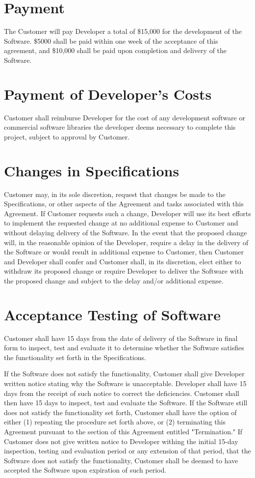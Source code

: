 \documentclass[11pt]{article}
\begin{document}
\section{Payment}	
The Customer will pay Developer a total of \$15,000 for the development of the Software. \$5000 shall be paid within one week of the acceptance of this agreement, and \$10,000 shall be paid upon completion and delivery of the Software.
\section{Payment of Developer’s Costs}
Customer shall reimburse Developer for the cost of any development software or commercial software libraries the developer deems necessary to complete this project, subject to approval by Customer.
\section{Changes in Specifications}
Customer may, in its sole discretion, request that changes be made to the Specifications, or other aspects of the Agreement and tasks associated with this Agreement. If Customer requests such a change, Developer will use its best efforts to implement the requested change at no additional expense to Customer and without delaying delivery of the Software. In the event that the proposed change will, in the reasonable opinion of the Developer, require a delay in the delivery of the Software or would result in additional expense to Customer, then Customer and Developer shall confer and Customer shall, in its discretion, elect either to withdraw its proposed change or require Developer to deliver the Software with the proposed change and subject to the delay and/or additional expense.
\section{Acceptance Testing of Software}
Customer shall have 15 days from the date of delivery of the Software in final form to inspect, test and evaluate it to determine whether the Software satisfies the functionality set forth in the Specifications.

If the Software does not satisfy the functionality, Customer shall give Developer written notice stating why the Software is unacceptable. Developer shall have 15 days from the receipt of such notice to correct the deficiencies. Customer shall then have 15 days to inspect, test and evaluate the Software. If the Software still does not satisfy the functionality set forth, Customer shall have the option of either (1) repeating the procedure set forth above, or (2) terminating this Agreement pursuant to the section of this Agreement entitled "Termination." If Customer does not give written notice to Developer withing the initial 15-day inspection, testing and evaluation period or any extension of that period, that the Software does not satisfy the functionality, Customer shall be deemed to have accepted the Software upon expiration of such period.
\end{document}
